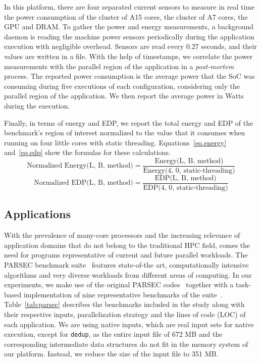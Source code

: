 In this platform, there are four separated current sensors to measure in real time the power consumption of the cluster of A15 cores, the cluster of A7 cores, the GPU and DRAM. 
To gather the power and energy measurements, a background daemon is reading the machine power sensors periodically during the application execution with negligible overhead. Sensors are read every 0.27 seconds, and their values are written in a file. With the help of timestamps, we correlate the power measurements with the parallel region of the application in a  \emph{post-mortem} process. The reported power consumption is the average power that the SoC was consuming during five executions of each configuration, considering only the parallel region of the application. We then report the average power in Watts during the execution. 

Finally, in terms of energy and EDP, we report the total energy and EDP of the benchmark's region of interest normalized to the value that it consumes when running on four little cores with static threading.
Equations~\ref{eq.energy} and~\ref{eq.edp} show the formulas for these calculations.
\begingroup\makeatletter\def\f@size{8}\check@mathfonts
\begin{equation}
  \text{Normalized Energy(L, B, method)} = \frac{\text{Energy(L, B, method)}}{\text{Energy(4, 0, static-threading)}}
  \label{eq.energy}
\end{equation}
\begin{equation}
  \text{Normalized EDP(L, B, method)} = \frac{\text{EDP(L, B, method)}}{\text{EDP(4, 0, static-threading)}}
  \label{eq.edp}
\end{equation}
\endgroup




\subsection{Applications}
\label{sec:parsec}

With the prevalence of many-core processors and the increasing relevance of application 
domains that do not belong to the traditional HPC field, comes the need for programs 
representative of current and future parallel workloads. 
The PARSEC benchmark suite~\cite{Bienia:PhD2011} features state-of-the art, 
computationally intensive algorithms and very diverse workloads from different areas of computing.
In our experiments, we make use of the original PARSEC codes~\cite{Bienia:PhD2011} together with a task-based implementation of nine representative benchmarks of the suite~\cite{Chasapis:TACO2016}. 
Table~\ref{tab:parsec} describes the benchmarks included in the study along with their respective inputs, parallelization strategy and the lines of code (LOC) of each application. We are using native inputs, which are real input sets for native execution, except for \texttt{dedup}, as the entire input file of 672 MB and the corresponding intermediate data structures do not fit in the memory system of our platform. Instead, we reduce the size of the input file to 351 MB.

